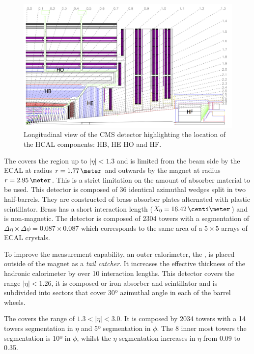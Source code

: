 \begin{figure}[!htb]
  \centering
  \includegraphics[width=1.0\textwidth]{Chapter02/CMS/Images/CMS_HCAL_Layout.png}
  \caption{Longitudinal view of the CMS detector highlighting the location of the \gls{HCAL} components: \gls{HB}, \gls{HE} \gls{HO} and \gls{HF}.}
  \label{FIGURE:ExperimentalApparatus_CMS_HCAL_Layout}
\end{figure}

The  covers the region up to $|\eta|<1.3$ and is limited from the beam side by the \gls{ECAL} at radius $r=1.77\,\meter$ and outwards by the magnet at radius $r=2.95\,\meter$. This is a strict limitation on the amount of absorber material to be used. This detector is composed of 36 identical azimuthal wedges split in two half-barrels. They are constructed of brass absorber plates alternated with plastic scintillator. Brass has a short interaction length ($X_0=16.42\,\centi\meter$) and is non-magnetic. The detector is composed of 2304 towers with a segmentation of $\Delta\eta \times \Delta\phi = 0.087 \times 0.087$ which corresponds to the same area of a $5 \times 5$ arrays of \gls{ECAL} crystals.

To improve the measurement capability, an outer calorimeter, the , is placed outside of the magnet as a \textit{tail catcher}. It increases the effective thickness of the hadronic calorimeter by over 10 interaction lengths. This detector covers the range $|\eta|<1.26$, it is composed or iron absorber and scintillator and is subdivided into sectors that cover 30º azimuthal angle in each of the barrel wheels. 

The  covers the range of $1.3<|\eta|<3.0$. It is composed by 2034 towers with a 14 towers segmentation in $\eta$ and 5º segmentation in $\phi$. The 8 inner most towers the segmentation is 10º in $\phi$, whilst the $\eta$ segmentation increases in $\eta$ from 0.09 to 0.35.

